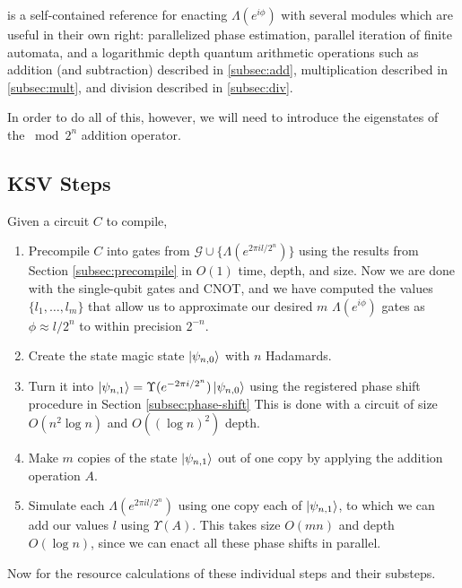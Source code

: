 \cite{ksv02} is a self-contained reference
for enacting $\Lambda(e^{i\phi})$ with several modules which are useful in
their own right:
parallelized phase estimation, parallel iteration of finite
automata, and a logarithmic depth quantum arithmetic operations such
as addition (and subtraction) described in \ref{subsec:add},
multiplication described in \ref{subsec:mult}, and division described
in \ref{subsec:div}.

In order to do all of this, however, we will need to introduce the eigenstates
of the $\bmod 2^n$ addition operator.

\subsection{KSV Steps}

Given a circuit $C$ to compile,

\begin{enumerate}
\item Precompile $C$ into gates from $\mathcal{G} \cup \{\Lambda(e^{2\pi i l / 2^n})\}$
using the results from Section \ref{subsec:precompile} in $O(1)$ time, depth,
and size.
Now we are done with the single-qubit gates and CNOT, and we have computed
the values $\{l_1, \ldots , l_m\}$ that allow us to approximate our
desired $m$
$\Lambda(e^{i\phi})$ gates as $\phi \approx l/2^n$ to within precision
$2^{-n}$.
\item Create the state magic state $\left\vert{\psi_{n,0}}\right\rangle$ with $n$ Hadamards.
\item Turn it into $\left\vert{\psi_{n,1}}\right\rangle = \Upsilon(e^{-2\pi i / 2^n}) \left\vert{\psi_{n,0}}\right\rangle$
using the registered phase shift procedure in Section \ref{subsec:phase-shift}
This is done with a circuit of size $O(n^2\log n)$ and $O((\log n)^2)$ depth.
\item Make $m$ copies of the state $\left\vert{\psi_{n,1}}\right\rangle$ out of one copy by 
applying the addition operation $A$.
\item Simulate each $\Lambda(e^{2\pi i l / 2^n})$
using one copy each of $\left\vert{\psi_{n,1}}\right\rangle$, to which we can add our
values $l$ using $\Upsilon(A)$.
This takes size $O(mn)$ and depth $O(\log n)$, since we can enact
all these phase shifts in parallel.
\end{enumerate}

Now for the resource calculations of these individual steps and their
substeps.

